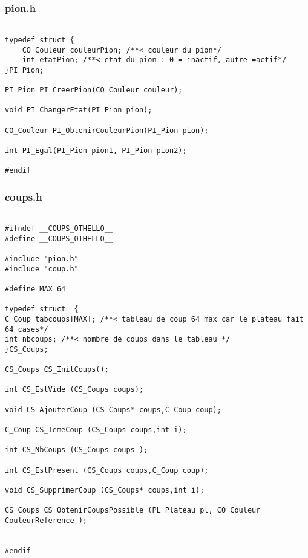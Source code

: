 \subsubsection{pion.h}
\begin{lstlisting}

typedef struct {
	CO_Couleur couleurPion; /**< couleur du pion*/
	int etatPion; /**< etat du pion : 0 = inactif, autre =actif*/
}PI_Pion;

PI_Pion PI_CreerPion(CO_Couleur couleur);

void PI_ChangerEtat(PI_Pion pion);

CO_Couleur PI_ObtenirCouleurPion(PI_Pion pion);

int PI_Egal(PI_Pion pion1, PI_Pion pion2);

#endif

\end{lstlisting}

\subsubsection{coups.h}
\begin{lstlisting}

#ifndef __COUPS_OTHELLO__
#define __COUPS_OTHELLO__

#include "pion.h"
#include "coup.h"

#define MAX 64

typedef struct  { 
C_Coup tabcoups[MAX]; /**< tableau de coup 64 max car le plateau fait 64 cases*/
int nbcoups; /**< nombre de coups dans le tableau */
}CS_Coups;

CS_Coups CS_InitCoups();

int CS_EstVide (CS_Coups coups);

void CS_AjouterCoup (CS_Coups* coups,C_Coup coup);

C_Coup CS_IemeCoup (CS_Coups coups,int i);

int CS_NbCoups (CS_Coups coups );

int CS_EstPresent (CS_Coups coups,C_Coup coup);

void CS_SupprimerCoup (CS_Coups* coups,int i);

CS_Coups CS_ObtenirCoupsPossible (PL_Plateau pl, CO_Couleur CouleurReference );


#endif

\end{lstlisting}


